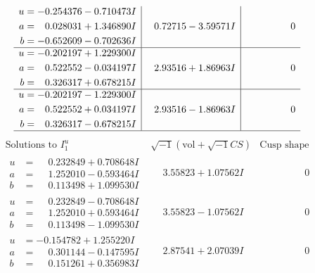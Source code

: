 \documentclass[1p]{elsarticle_modified}
\theoremstyle{definition}
\newcommand{\I}{\sqrt{-1}}
\begin{document}
$$\begin{array}{c|c|c}
\begin{aligned}
u &= -0.254376 - 0.710473 I \\
a &= \phantom{-}0.028031 + 1.346890 I \\
b &= -0.652609 - 0.702636 I\end{aligned}
 & \phantom{-}0.72715 - 3.59571 I & \phantom{-0.000000 } 0 \\ \hline\begin{aligned}
u &= -0.202197 + 1.229300 I \\
a &= \phantom{-}0.522552 - 0.034197 I \\
b &= \phantom{-}0.326317 + 0.678215 I\end{aligned}
 & \phantom{-}2.93516 + 1.86963 I & \phantom{-0.000000 } 0 \\ \hline\begin{aligned}
u &= -0.202197 - 1.229300 I \\
a &= \phantom{-}0.522552 + 0.034197 I \\
b &= \phantom{-}0.326317 - 0.678215 I\end{aligned}
 & \phantom{-}2.93516 - 1.86963 I & \phantom{-0.000000 } 0\\
 \hline 
 \end{array}$$\newpage$$\begin{array}{c|c|c}  
\text{Solutions to }I^u_{1}& \I (\text{vol} + \sqrt{-1}CS) & \text{Cusp shape}\\
 \hline 
\begin{aligned}
u &= \phantom{-}0.232849 + 0.708648 I \\
a &= \phantom{-}1.252010 - 0.593464 I \\
b &= \phantom{-}0.113498 + 1.099530 I\end{aligned}
 & \phantom{-}3.55823 + 1.07562 I & \phantom{-0.000000 } 0 \\ \hline\begin{aligned}
u &= \phantom{-}0.232849 - 0.708648 I \\
a &= \phantom{-}1.252010 + 0.593464 I \\
b &= \phantom{-}0.113498 - 1.099530 I\end{aligned}
 & \phantom{-}3.55823 - 1.07562 I & \phantom{-0.000000 } 0 \\ \hline\begin{aligned}
u &= -0.154782 + 1.255220 I \\
a &= \phantom{-}0.301144 - 0.147595 I \\
b &= \phantom{-}0.151261 + 0.356983 I\end{aligned}
 & \phantom{-}2.87541 + 2.07039 I & \phantom{-0.000000 } 0 \\ \hline\begin{aligned}

\end{aligned}
\end{array}$$
\end{document}
